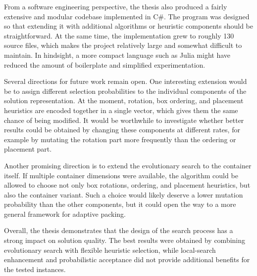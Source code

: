 From a software engineering perspective, the thesis also produced a 
fairly extensive and modular codebase implemented in C\#. The program was 
designed so that extending it with additional algorithms or heuristic components should be straightforward. 
At the same time, the implementation grew to roughly 130 source files, which makes the project relatively 
large and somewhat difficult to maintain. In hindsight, a more compact language such as Julia 
might have reduced the amount of boilerplate and simplified experimentation.

Several directions for future work remain open. One interesting extension would be to assign 
different selection probabilities to the individual components of the solution representation. 
At the moment, rotation, box ordering, and placement heuristics are encoded together in a single vector, 
which gives them the same chance of being modified. It would be worthwhile to investigate whether 
better results could be obtained by changing these components at different rates, 
for example by mutating the rotation part more frequently than the ordering or placement part.

Another promising direction is to extend the evolutionary search to the container itself. 
If multiple container dimensions were available, the algorithm could be allowed to choose 
not only box rotations, ordering, and placement heuristics, but also the container variant. 
Such a choice would likely deserve a lower mutation probability than the other components, 
but it could open the way to a more general framework for adaptive packing.

Overall, the thesis demonstrates that the design of the search 
process has a strong impact on solution quality. The best results were obtained by 
combining evolutionary search with flexible heuristic selection, while local-search 
enhancement and probabilistic acceptance did not provide additional benefits for the tested instances.